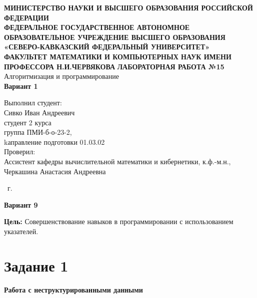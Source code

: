 \documentclass[14pt,a4paper]{article}
\begin{document}
\begin{titlepage}
\begin{center}
{\large\scshape\bfseries
МИНИСТЕРСТВО НАУКИ И ВЫСШЕГО ОБРАЗОВАНИЯ РОССИЙСКОЙ ФЕДЕРАЦИИ\\
ФЕДЕРАЛЬНОЕ ГОСУДАРСТВЕННОЕ АВТОНОМНОЕ ОБРАЗОВАТЕЛЬНОЕ УЧРЕЖДЕНИЕ ВЫСШЕГО ОБРАЗОВАНИЯ\\
«СЕВЕРО-КАВКАЗСКИЙ ФЕДЕРАЛЬНЫЙ УНИВЕРСИТЕТ»\\
ФАКУЛЬТЕТ МАТЕМАТИКИ И КОМПЬЮТЕРНЫХ НАУК ИМЕНИ ПРОФЕССОРА Н.И.ЧЕРВЯКОВА}
\vfill
{\Large\bfseries ЛАБОРАТОРНАЯ РАБОТА №15}\\[2mm]
{\large Алгоритмизация и программирование}\\[6mm]
{\Large\bfseries Вариант 1}\\[20mm]
\end{center}
\begin{flushright}
\large{
Выполнил студент:\\
Сивко Иван Андреевич\\
студент 2 курса\\
группа ПМИ-б-о-23-2,\\
kаправление подготовки 01.03.02\\[5mm]
Проверил:\\
Ассистент кафедры вычислительной математики и кибернетики, к.ф.-м.н.,\\
Черкашина Анастасия Андреевна}
\end{flushright}
\vfill
\begin{center}
\the\year\ г.
\end{center}
\end{titlepage}


\begin{center}
    \textbf{Вариант 9}
\end{center}
{\large {\bfseries Цель:} Совершенствование навыков в программировании с использованием\\ указателей.}

\section*{Задание 1}
\textbf{Работа с неструктурированными данными}
\renewcommand{\thesubsection}{\arabic{subsection}} %
\setcounter{subsection}{0} %
\end{document}
